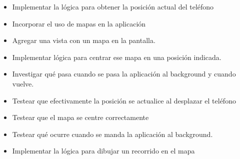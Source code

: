 \begin{enumerate}
\begin{itemize}
    \begin{itemize}
    \item
      Implementar la lógica para obtener la posición actual del teléfono
    \item
      Incorporar el uso de mapas en la aplicación
    \item
      Agregar una vista con un mapa en la pantalla.
    \item
      Implementar lógica para centrar ese mapa en una posición indicada.
    \item
      Investigar qué pasa cuando se pasa la aplicación al background y
      cuando vuelve.
    \item
      Testear que efectivamente la posición se actualice al desplazar el
      teléfono
    \item
      Testear que el mapa se centre correctamente
    \item
      Testear qué ocurre cuando se manda la aplicación al background.
    \item
      Implementar la lógica para dibujar un recorrido en el mapa
    \end{itemize}
  \end{itemize}
\end{enumerate}
